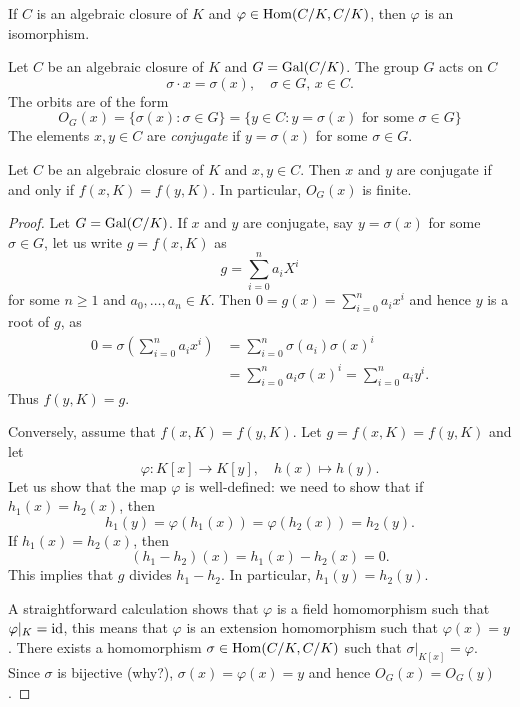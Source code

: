 \begin{exercise}
\label{xca:C/K_bijective}
If $C$ is an algebraic closure of $K$ and 
$\varphi\in\operatorname{Hom}(C/K,C/K)$, 
then $\varphi$ is an isomorphism. 
\end{exercise}


Let $C$ be an algebraic closure of $K$ and 
$G=\operatorname{Gal}(C/K)$. The group $G$ acts on $C$
\[
\sigma\cdot x=\sigma(x),\quad
\sigma\in G,\,x\in C.
\]
The orbits 
are of the form 
\[
O_G(x)=\{\sigma(x):\sigma\in G\}
=\{y\in C:y=\sigma(x)\text{ for some $\sigma\in G$}\}
\]
The elements $x,y\in C$ are \emph{conjugate} 
if $y=\sigma(x)$ for some $\sigma\in G$. 

\begin{proposition}
\label{pro:conjugate}
    Let $C$ be an algebraic closure of $K$ and $x,y\in C$. Then 
    $x$ and $y$ are conjugate if and only if $f(x,K)=f(y,K)$. In particular, 
    $O_G(x)$ is finite. 
\end{proposition}

\begin{proof}
    Let $G=\operatorname{Gal}(C/K)$. 
    If $x$ and $y$ are conjugate, say $y=\sigma(x)$ for some $\sigma\in G$, 
    let us write $g=f(x,K)$ as 
    \[
    g=\sum_{i=0}^{n} a_iX^i
    \]
    for some $n\geq1$ and $a_0,\dots,a_{n}\in K$. 
    Then $0=g(x)=\sum_{i=0}^{n}a_ix^i$ and hence $y$ is
    a root of $g$, as 
    \begin{align*}
    0=\sigma\left(\sum_{i=0}^{n}a_ix^i\right)
    &=\sum_{i=0}^{n}\sigma(a_i)\sigma(x)^i\\
    &=\sum_{i=0}^{n}a_i\sigma(x)^i
    =\sum_{i=0}^{n}a_iy^i.
    \end{align*}
    Thus $f(y,K)=g$. 
    
    Conversely, assume that $f(x,K)=f(y,K)$. Let
    $g=f(x,K)=f(y,K)$ and let 
    \[
    \varphi\colon K[x]\to K[y],
    \quad
    h(x)\mapsto h(y).
    \]
    Let us show that the map $\varphi$ is well-defined: we need to show 
    that if 
    $h_1(x)=h_2(x)$, then 
    \[
    h_1(y)=\varphi(h_1(x))=\varphi(h_2(x))=h_2(y).
    \]
    If $h_1(x)=h_2(x)$, then 
    \[
    (h_1-h_2)(x)=h_1(x)-h_2(x)=0.
    \]
    This implies
    that $g$ divides $h_1-h_2$. In particular, $h_1(y)=h_2(y)$.
    
    A straightforward calculation shows that $\varphi$ is a field 
    homomorphism such that $\varphi|_K=\operatorname{id}$, this means that
    $\varphi$ is 
    an extension homomorphism such that $\varphi(x)=y$. There exists a homomorphism 
    $\sigma\in\operatorname{Hom}(C/K,C/K)$ such that 
    $\sigma|_{K[x]}=\varphi$. Since $\sigma$ is bijective 
    (why?), 
    $\sigma(x)=\varphi(x)=y$ and hence 
    $O_G(x)=O_G(y)$. 
\end{proof}

